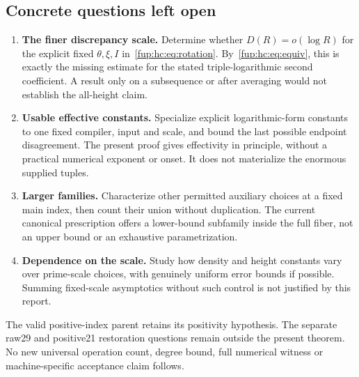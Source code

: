 \documentclass[11pt,letterpaper]{article}
\newcommand{\fupR}{0}
\renewcommand{\thesection}{\fupR.\arabic{section}}
\renewcommand{\theHsection}{\fupR.\arabic{section}}
\newcommand{\fupappendix}{%
  \setcounter{section}{0}%
  \renewcommand{\thesection}{\fupR.\Alph{section}}%
  \renewcommand{\theHsection}{\fupR.\Alph{section}}}
\theoremstyle{definition}\newtheorem{definition}[theorem]{Definition}
\theoremstyle{remark}\newtheorem{remark}[theorem]{Remark}
\begin{document}
\subsection{Concrete questions left open}
\begin{enumerate}
\item \textbf{The finer discrepancy scale.} Determine whether $D(R)=o(\log R)$ for the explicit fixed $\theta,\xi,I$ in~\eqref{fup:hc:eq:rotation}. By~\eqref{fup:hc:eq:equiv}, this is exactly the missing estimate for the stated triple-logarithmic second coefficient. A result only on a subsequence or after averaging would not establish the all-height claim.
\item \textbf{Usable effective constants.} Specialize explicit logarithmic-form constants to one fixed compiler, input and scale, and bound the last possible endpoint disagreement. The present proof gives effectivity in principle, without a practical numerical exponent or onset. It does not materialize the enormous supplied tuples.
\item \textbf{Larger families.} Characterize other permitted auxiliary choices at a fixed main index, then count their union without duplication. The current canonical prescription offers a lower-bound subfamily inside the full fiber, not an upper bound or an exhaustive parametrization.
\item \textbf{Dependence on the scale.} Study how density and height constants vary over prime-scale choices, with genuinely uniform error bounds if possible. Summing fixed-scale asymptotics without such control is not justified by this report.
\end{enumerate}
The valid positive-index parent retains its positivity hypothesis. The separate raw29 and positive21 restoration questions remain outside the present theorem. No new universal operation count, degree bound, full numerical witness or machine-specific acceptance claim follows.

\fupappendix
\end{document}
